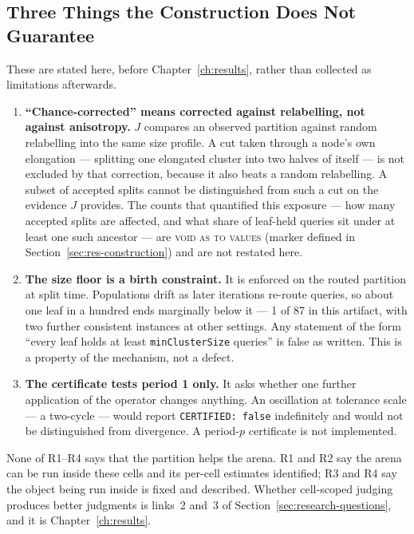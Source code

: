 \subsection{Three Things the Construction Does Not Guarantee}\label{sec:arch-limits}

These are stated here, before Chapter~\ref{ch:results}, rather than
collected as limitations afterwards.

\begin{enumerate}
\item \textbf{``Chance-corrected'' means corrected against relabelling,
not against anisotropy.} $J$ compares an observed partition against
random relabelling into the same size profile. A cut taken through a
node's own elongation --- splitting one elongated cluster into two
halves of itself --- is not excluded by that correction, because it
also beats a random relabelling. A subset of accepted splits cannot be
distinguished from such a cut on the evidence
$J$ provides. The counts that quantified this exposure --- how many
accepted splits are affected, and what share of leaf-held queries sit
under at least one such ancestor --- are \textsc{void as to values}
(marker defined in Section~\ref{sec:res-construction})
and are not restated here.

\item \textbf{The size floor is a birth constraint.} It is enforced on
the routed partition at split time. Populations drift as later
iterations re-route queries, so about one leaf in a hundred ends
marginally below it --- 1 of 87 in this artifact, with two further
consistent instances at other settings. Any statement of the form
``every leaf holds at least \texttt{minClusterSize} queries'' is false
as written. This is a property of the mechanism, not a defect.

\item \textbf{The certificate tests period 1 only.} It asks whether one
further application of the operator changes anything. An oscillation at
tolerance scale --- a two-cycle --- would report
\texttt{CERTIFIED: false} indefinitely and would not be distinguished
from divergence. A period-$p$ certificate is not implemented.
\end{enumerate}

None of R1--R4 says that the partition helps the arena. R1 and R2 say
the arena can be run inside these cells and its per-cell estimates
identified; R3 and R4 say the object being run inside is fixed and
described. Whether cell-scoped judging produces better judgments is
links~2 and~3 of Section~\ref{sec:research-questions}, and it is
Chapter~\ref{ch:results}.

